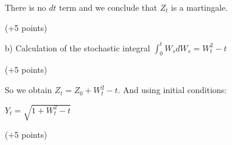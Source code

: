 \documentclass[pdftex,12pt,a4paper]{article}
\begin{document}
There is no $ dt $ term and we conclude that $Z_{t}$ is a martingale.

(+5 points)

b) Calculation of the stochastic integral $ \int_{0}^{t}W_{s}dW_{s}=W_{t}^{2}-t $

(+5 points)

So we obtain  $ Z_{t}=Z_{0}+W_{t}^{2}-t $. And using initial conditions:

$ Y_{t}=\sqrt{1+W_{t}^{2}-t} $

(+5 points)








\printindex %
\end{document}
